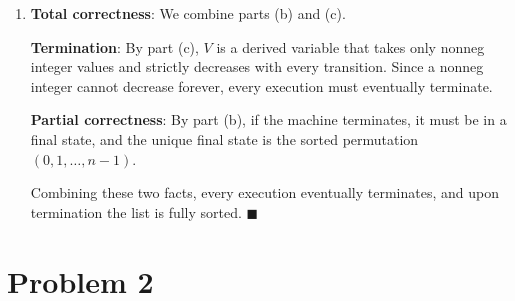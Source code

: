 \documentclass[11pt]{article}
\begin{document}
\begin{enumerate}[label=\textbf{(\alph*)}]
Since $a_k' = a_k$ for $k < i$ and $k > j$, only positions $i$ through $j$
contribute to $V' - V$:
\[
    V' - V = \sum_{k=i}^{j}(a_k' - a_k)\cdot n^{n-1-k}.
\]
Each coefficient $a_k' - a_k$ is an integer, and each weight $n^{n-1-k}$ for
$k \leq j$ satisfies $n - 1 - k \geq n - 1 - j$, so $n^{n-1-j} \mid n^{n-1-k}$.
Therefore every term is divisible by $n^{n-1-j}$, and so $V' - V$ is an integer
multiple of $n^{n-1-j}$. It therefore suffices to show $V' - V < 0$: since $V' - V$
is an integer multiple of $n^{n-1-j}$, a negative value must be at most $-n^{n-1-j}$,
and $n^{n-1-j} \geq 1$ gives us $V' - V \leq -n^{n-1-j} \leq -1$.

To show $V' - V < 0$, factor out $n^{n-1-j}$ from the difference:
\[
    \frac{V' - V}{n^{n-1-j}} = \sum_{k=i}^{j}(a_k' - a_k)\cdot n^{j-k}.
\]
This is the difference between two base-$n$ numbers formed from the same
multiset of digits. In the new number, the most significant position $k = i$
has digit $a_i' = a_j$, while in the old it had digit $a_i > a_j$. Therefore
the most significant digit has strictly decreased, which means the new number
is strictly smaller than the old. Hence $V' - V < 0$, and therefore:
\[
    V' - V \leq -n^{n-1-j} \leq -1 < 0.
\]
So $V$ strictly decreases with every good reversal. \checkmark

\item \textbf{Total correctness}: We combine parts (b) and (c).

\textbf{Termination}: By part (c), $V$ is a derived variable that takes only
nonneg integer values and strictly decreases with every transition. Since a
nonneg integer cannot decrease forever, every execution must eventually
terminate.

\textbf{Partial correctness}: By part (b), if the machine terminates, it must
be in a final state, and the unique final state is the sorted permutation
$(0, 1, \ldots, n-1)$.

Combining these two facts, every execution eventually terminates, and upon
termination the list is fully sorted. $\blacksquare$

\end{enumerate}

\section*{Problem 2}
\end{document}
